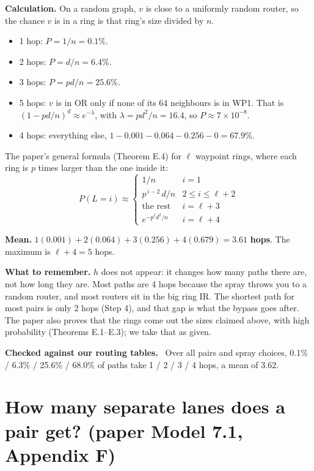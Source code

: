 \documentclass[11pt]{article}
\newenvironment{checked}
  {\par\smallskip\noindent\begin{lrbox}{\checkedbox}%
   \begin{minipage}{\dimexpr\linewidth-2\fboxsep\relax}%
   \textbf{Checked against our routing tables.}\ }
  {\end{minipage}\end{lrbox}\colorbox{black!5}{\usebox{\checkedbox}}\par\smallskip}
\begin{document}
\textbf{Calculation.} On a random graph, $v$ is close to a uniformly random router, so the chance $v$ is in a ring is that ring's size divided by $n$.
\begin{itemize}
  \item 1 hop: $P = 1/n = 0.1\%$.
  \item 2 hops: $P = d/n = 6.4\%$.
  \item 3 hops: $P = p d / n = 25.6\%$.
  \item 5 hops: $v$ is in OR only if none of its 64 neighbours is in WP1. That is $(1 - pd/n)^d \approx e^{-\lambda}$, with $\lambda = p d^2 / n = 16.4$, so $P \approx 7 \times 10^{-8}$.
  \item 4 hops: everything else, $1 - 0.001 - 0.064 - 0.256 - 0 = 67.9\%$.
\end{itemize}

The paper's general formula (Theorem E.4) for $\ell$ waypoint rings, where each ring is $p$ times larger than the one inside it:
\[
P(L = i) \approx
\begin{cases}
  1/n & i = 1 \\
  p^{\,i-2}\, d/n & 2 \le i \le \ell + 2 \\
  \text{the rest} & i = \ell + 3 \\
  e^{-p^{\ell} d^2 / n} & i = \ell + 4
\end{cases}
\]

\textbf{Mean.} $1(0.001) + 2(0.064) + 3(0.256) + 4(0.679) = \mathbf{3.61}$ \textbf{hops}. The maximum is $\ell + 4 = 5$ hops.

\textbf{What to remember.} $h$ does not appear: it changes how many paths there are, not how long they are. Most paths are 4 hops because the spray throws you to a random router, and most routers sit in the big ring IR. The shortest path for most pairs is only 2 hops (Step 4), and that gap is what the bypass goes after. The paper also proves that the rings come out the sizes claimed above, with high probability (Theorems E.1--E.3); we take that as given.

\begin{checked}
Over all pairs and spray choices, 0.1\% / 6.3\% / 25.6\% / 68.0\% of paths take 1 / 2 / 3 / 4 hops, a mean of 3.62.
\end{checked}

\section{How many separate lanes does a pair get? (paper Model 7.1, Appendix F)}
\end{document}

